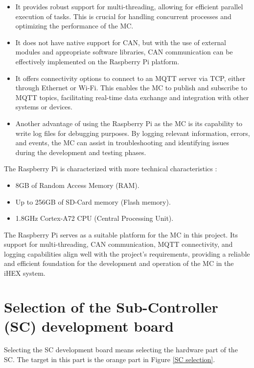 \begin{itemize}
    \item It provides robust support for multi-threading, allowing for efficient parallel execution of tasks. This is crucial for handling concurrent processes and optimizing the performance of the MC.
    \item It does not have native support for CAN, but with the use of external modules and appropriate software libraries, CAN communication can be effectively implemented on the Raspberry Pi platform.
    \item It offers connectivity options to connect to an MQTT server via TCP, either through Ethernet or Wi-Fi. This enables the MC to publish and subscribe to MQTT topics, facilitating real-time data exchange and integration with other systems or devices.
    \item Another advantage of using the Raspberry Pi as the MC is its capability to write log files for debugging purposes. By logging relevant information, errors, and events, the MC can assist in troubleshooting and identifying issues during the development and testing phases.
\end{itemize}

The Raspberry Pi is characterized with more technical characteristics \cite{R13}:

\begin{itemize}
    \item 8GB of Random Access Memory (RAM).
    \item Up to 256GB of SD-Card memory (Flash memory).
    \item 1.8GHz Cortex-A72 CPU (Central Processing Unit).
\end{itemize}

The Raspberry Pi serves as a suitable platform for the MC in this project. Its support for multi-threading, CAN communication, MQTT connectivity, and logging capabilities align well with the project's requirements, providing a reliable and efficient foundation for the development and operation of the MC in the iHEX system.

\section{Selection of the Sub-Controller (SC) development board}

Selecting the SC development board means selecting the hardware part of the SC. The target in this part is the orange part in Figure \ref{SC selection}.


